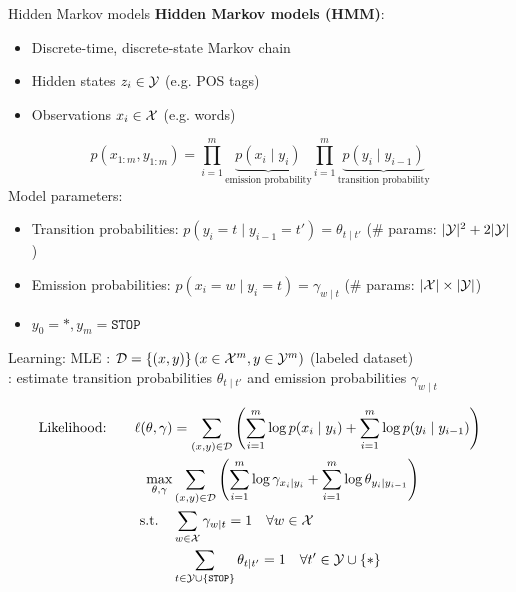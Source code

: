 \documentclass[usenames,dvipsnames,notes,11pt,aspectratio=169]{beamer}
\newcommand{\pdfnote}[1]{}
\begin{document}
\begin{frame}
    {Hidden Markov models}
    \textbf{Hidden Markov models (HMM)}:\\
    \begin{itemize}
        \item Discrete-time, discrete-state Markov chain
        \item Hidden states $z_i \in \mathcal{Y}$ (e.g. POS tags)
        \item Observations $x_i\in \mathcal{X}$ (e.g. words)
    \end{itemize}
    $$
    p(x_{1:m},y_{1:m}) = \prod_{i=1}^m \underbrace{p(x_i\mid y_i)}_{\textstyle\text{emission probability}}
    \prod_{i=1}^m \underbrace{p(y_i\mid y_{i-1})}_{\textstyle\text{transition probability}}
    $$
    Model parameters:\\
    \begin{itemize}
        \item Transition probabilities: $p(y_i=t\mid y_{i-1}=t') = \theta_{t\mid t'}$ (\# params: $|\mathcal{Y}|^2 + 2|\mathcal{Y}|$)
        \item Emission probabilities: $p(x_i=w\mid y_i=t) = \gamma_{w\mid t}$ (\# params: $|\mathcal{X}|\times |\mathcal{Y}|$) 
        \item $y_0=*, y_m=\texttt{STOP}$
    \end{itemize}
    \pdfnote{
        For now, the states are observed in the data.
    }
    \pdfnote{
        2Y: start -> y, end -> y
    }
\end{frame}

\begin{frame}
    {Learning: MLE}
    : $\mathcal{D} = \left\{ (x,y) \right\} (x\in\mathcal{X}^m, y\in\mathcal{Y}^m)$ (labeled dataset)\\
    : estimate transition probabilities $\theta_{t\mid t'}$ and emission probabilities $\gamma_{w\mid t}$

    \begin{align*}
        \text{Likelihood:}\qquad \ell(\theta,\gamma) &= \sum_{(x,y)\in\mathcal{D}} \left( 
            \sum_{i=1}^m \log p(x_i\mid y_i) +
            \sum_{i=1}^m \log p(y_i\mid y_{i-1})  \right) \\
        \max_{\theta,\gamma} & \sum_{(x,y)\in\mathcal{D}} \left( 
            \sum_{i=1}^m \log \gamma_{x_i\mid y_i} +
            \sum_{i=1}^m \log \theta_{y_i\mid y_{i-1}}
         \right)\\
        \text{s.t.} \quad & \sum_{w\in\mathcal{X}} \gamma_{w\mid t} = 1 \quad \forall w\in\mathcal{X} \\
        \quad & \sum_{t\in\mathcal{Y}\cup\left\{ \texttt{STOP} \right\}} \theta_{t\mid t'} = 1 \quad \forall t'\in\mathcal{Y}\cup\left\{ * \right\}
    \end{align*}
\end{frame}
\end{document}

